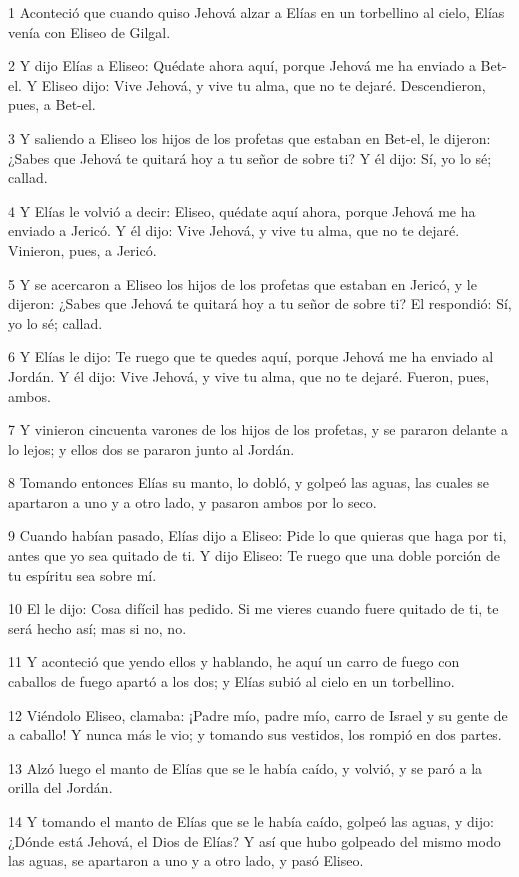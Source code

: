 \par 1 Aconteció que cuando quiso Jehová alzar a Elías en un torbellino al cielo, Elías venía con Eliseo de Gilgal.
\par 2 Y dijo Elías a Eliseo: Quédate ahora aquí, porque Jehová me ha enviado a Bet-el. Y Eliseo dijo: Vive Jehová, y vive tu alma, que no te dejaré. Descendieron, pues, a Bet-el.
\par 3 Y saliendo a Eliseo los hijos de los profetas que estaban en Bet-el, le dijeron: ¿Sabes que Jehová te quitará hoy a tu señor de sobre ti? Y él dijo: Sí, yo lo sé; callad.
\par 4 Y Elías le volvió a decir: Eliseo, quédate aquí ahora, porque Jehová me ha enviado a Jericó. Y él dijo: Vive Jehová, y vive tu alma, que no te dejaré. Vinieron, pues, a Jericó.
\par 5 Y se acercaron a Eliseo los hijos de los profetas que estaban en Jericó, y le dijeron: ¿Sabes que Jehová te quitará hoy a tu señor de sobre ti? El respondió: Sí, yo lo sé; callad.
\par 6 Y Elías le dijo: Te ruego que te quedes aquí, porque Jehová me ha enviado al Jordán. Y él dijo: Vive Jehová, y vive tu alma, que no te dejaré. Fueron, pues, ambos.
\par 7 Y vinieron cincuenta varones de los hijos de los profetas, y se pararon delante a lo lejos; y ellos dos se pararon junto al Jordán.
\par 8 Tomando entonces Elías su manto, lo dobló, y golpeó las aguas, las cuales se apartaron a uno y a otro lado, y pasaron ambos por lo seco.
\par 9 Cuando habían pasado, Elías dijo a Eliseo: Pide lo que quieras que haga por ti, antes que yo sea quitado de ti. Y dijo Eliseo: Te ruego que una doble porción de tu espíritu sea sobre mí.
\par 10 El le dijo: Cosa difícil has pedido. Si me vieres cuando fuere quitado de ti, te será hecho así; mas si no, no.
\par 11 Y aconteció que yendo ellos y hablando, he aquí un carro de fuego con caballos de fuego apartó a los dos; y Elías subió al cielo en un torbellino.
\par 12 Viéndolo Eliseo, clamaba: ¡Padre mío, padre mío, carro de Israel y su gente de a caballo! Y nunca más le vio; y tomando sus vestidos, los rompió en dos partes.
\par 13 Alzó luego el manto de Elías que se le había caído, y volvió, y se paró a la orilla del Jordán.
\par 14 Y tomando el manto de Elías que se le había caído, golpeó las aguas, y dijo: ¿Dónde está Jehová, el Dios de Elías? Y así que hubo golpeado del mismo modo las aguas, se apartaron a uno y a otro lado, y pasó Eliseo.
